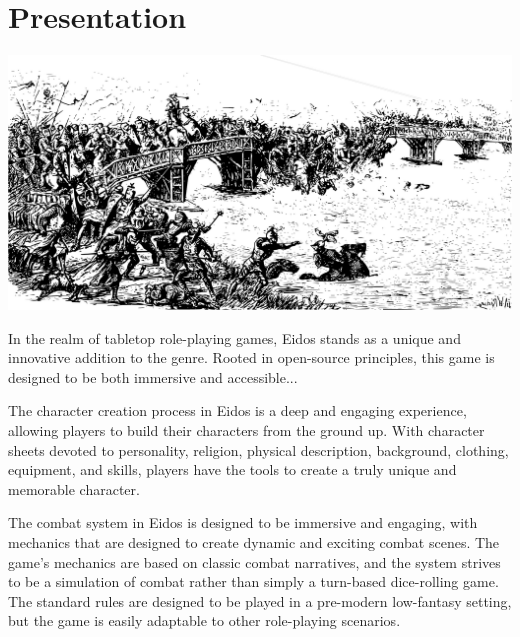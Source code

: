 \documentclass[12pt]{book}
\begin{document}
\tableofcontents


\chapter{Presentation}

\begin{center}
    \includegraphics[width=\textwidth]{./images/presentation01.pdf}
\end{center}


In the realm of tabletop role-playing games, Eidos stands as a unique and innovative addition to the genre. Rooted in open-source principles, this game is designed to be both immersive and accessible...

The character creation process in Eidos is a deep and engaging experience, allowing players to build their characters from the ground up. With character sheets devoted to personality, religion, physical description, background, clothing, equipment, and skills, players have the tools to create a truly unique and memorable character.

The combat system in Eidos is designed to be immersive and engaging, with mechanics that are designed to create dynamic and exciting combat scenes. The game's mechanics are based on classic combat narratives, and the system strives to be a simulation of combat rather than simply a turn-based dice-rolling game. The standard rules are designed to be played in a pre-modern low-fantasy setting, but the game is easily adaptable to other role-playing scenarios.
\end{document}
